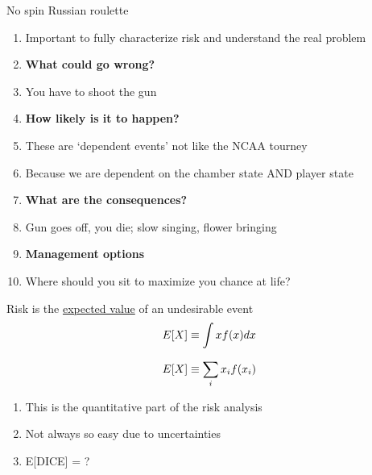 \documentclass[aspectratio=1610,pdftex,dvipsnames,compress,xcolor={dvipsnames}]{beamer}
\begin{document}
\begin{frame}{No spin Russian roulette}
    \begin{enumerate}[series=outerlist,topsep=0pt,itemsep=3pt,leftmargin=*,label=(\arabic*)]
        \item[]Important to fully characterize risk and understand the real problem
            \vspace{0.10in}
        \item[]\textbf{What could go wrong?}
        \item[]You have to shoot the gun
            \vspace{0.10in}
        \item[]\textbf{How likely is it to happen?}
        \item[]These are `dependent events' not like the NCAA tourney
        \item[]Because we are dependent on the chamber state AND player state
            \vspace{0.10in}
        \item[]\textbf{What are the consequences?}
        \item[]Gun goes off, you die; slow singing, flower bringing
            \vspace{0.10in}
        \item[]\textbf{Management options}
        \item[]Where should you sit to maximize you chance at life?
    \end{enumerate}
\end{frame}


\begin{frame}{Risk is the \href{https://uidaho.pressbooks.pub/riskassessment/chapter/statistical-moments/}{expected value} of an undesirable event}
    \begin{equation}
        \LARGE
        E[X] \equiv \int xf(x)dx
    \end{equation}

    \begin{equation}
        \LARGE
        E[X] \equiv \sum_i x_i f(x_i)
    \end{equation}

    \vspace*{\fill}

    \begin{enumerate}[series=outerlist,topsep=0pt,itemsep=21pt,leftmargin=*,label=(\arabic*)]
        \item[]This is the quantitative part of the risk analysis
        \item[]Not always so easy due to uncertainties
        \item[]E[DICE] = ?
    \end{enumerate}
\end{frame}
\end{document}
